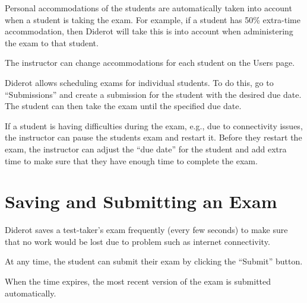 \begin{cluster}
\label{grp:grm:quiz::accommodations}

\begin{gram}[Accommodations]
\label{grm:quiz::accommodations}
Personal accommodations of the students are automatically taken into account when a student is taking the exam.  For example, if a student has 50\% extra-time accommodation, then Diderot will take this is into account when administering the exam to that student.  

The instructor can change accommodations for each student on the Users page. 

\end{gram}
\end{cluster}

\begin{cluster}
\label{grp:grm:quiz::make-up-exams}

\begin{gram}
\label{grm:quiz::make-up-exams}
Diderot allows scheduling exams for individual students.  To do this, go to ``Submissions'' and create a submission for the student with the desired due date.  The student can then take the exam until the specified due date.

\end{gram}
\end{cluster}

\begin{cluster}
\label{grp:grm:quiz::pausing-and-restarting-an-exam}

\begin{gram}
\label{grm:quiz::pausing-and-restarting-an-exam}
If a student is having difficulties during the exam, e.g., due to connectivity issues, the instructor can pause the students exam and restart it.  Before they restart the exam, the instructor can adjust the ``due date'' for the student and add extra time to make sure that they have enough time to complete the exam. 

\end{gram}
\end{cluster}


\section{Saving and Submitting an Exam}
\label{ch:quiz::submit}

\begin{cluster}
\label{grp:grm:quiz::saves}

\begin{gram}
\label{grm:quiz::saves}
Diderot saves a test-taker's exam frequently (every few seconds) to make sure that no work would be lost due to problem such as internet connectivity.  

At any time, the student can submit their exam by clicking the ``Submit'' button.

When the time expires, the most recent version of the exam is submitted automatically.

\end{gram}
\end{cluster}


